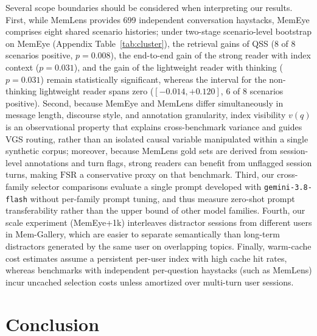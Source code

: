 \documentclass[10pt]{article}
\newcommand{\qss}{QSS}
\begin{document}
Several scope boundaries should be considered when interpreting our results. First, while MemLens provides 699 independent conversation haystacks, MemEye comprises eight shared scenario histories; under two-stage scenario-level bootstrap on MemEye (Appendix Table~\ref{tab:cluster}), the retrieval gains of \qss{} (8 of 8 scenarios positive, $p{=}0.008$), the end-to-end gain of the strong reader with index context ($p{=}0.031$), and the gain of the lightweight reader with thinking ($p{=}0.031$) remain statistically significant, whereas the interval for the non-thinking lightweight reader spans zero ($[-0.014, +0.120]$, 6 of 8 scenarios positive). Second, because MemEye and MemLens differ simultaneously in message length, discourse style, and annotation granularity, index visibility $v(q)$ is an observational property that explains cross-benchmark variance and guides VGS routing, rather than an isolated causal variable manipulated within a single synthetic corpus; moreover, because MemLens gold sets are derived from session-level annotations and turn flags, strong readers can benefit from unflagged session turns, making $\mathrm{FSR}$ a conservative proxy on that benchmark. Third, our cross-family selector comparisons evaluate a single prompt developed with \texttt{gemini-3.8-flash} without per-family prompt tuning, and thus measure zero-shot prompt transferability rather than the upper bound of other model families. Fourth, our scale experiment (MemEye+1k) interleaves distractor sessions from different users in Mem-Gallery, which are easier to separate semantically than long-term distractors generated by the same user on overlapping topics. Finally, warm-cache cost estimates assume a persistent per-user index with high cache hit rates, whereas benchmarks with independent per-question haystacks (such as MemLens) incur uncached selection costs unless amortized over multi-turn user sessions.

\section{Conclusion}
\label{sec:conclusion}
\end{document}
